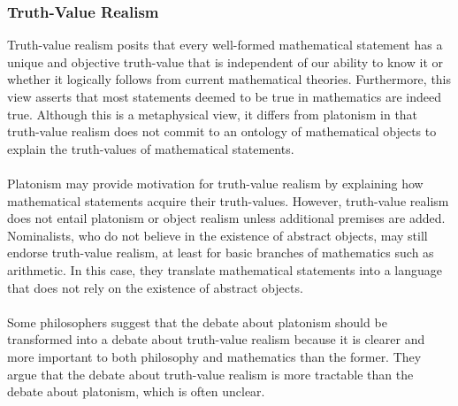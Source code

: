 \documentclass[10pt,a4paper]{article}
\newcounter{theo}
\begin{document}
                    \subsubsection{Truth-Value Realism}
                        Truth-value realism posits that every well-formed mathematical statement has a unique and objective truth-value that is independent of our ability to know it or whether it logically follows from current mathematical theories. Furthermore, this view asserts that most statements deemed to be true in mathematics are indeed true. Although this is a metaphysical view, it differs from platonism in that truth-value realism does not commit to an ontology of mathematical objects to explain the truth-values of mathematical statements.
                        \\
                        \\
                        Platonism may provide motivation for truth-value realism by explaining how mathematical statements acquire their truth-values. However, truth-value realism does not entail platonism or object realism unless additional premises are added. Nominalists, who do not believe in the existence of abstract objects, may still endorse truth-value realism, at least for basic branches of mathematics such as arithmetic. In this case, they translate mathematical statements into a language that does not rely on the existence of abstract objects.
                        \\
                        \\
                        Some philosophers suggest that the debate about platonism should be transformed into a debate about truth-value realism because it is clearer and more important to both philosophy and mathematics than the former. They argue that the debate about truth-value realism is more tractable than the debate about platonism, which is often unclear.
\end{document}
